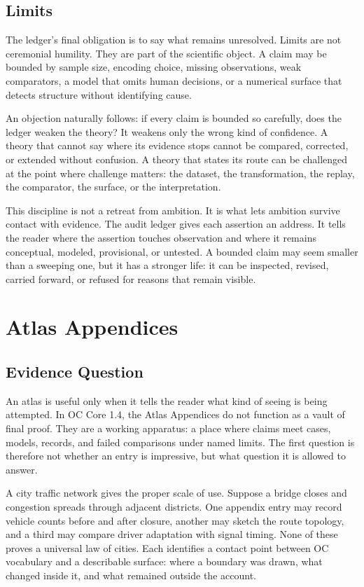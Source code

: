 \documentclass[11pt,a4paper,openany]{book}
\begin{document}
\subsection{Limits}
The ledger's final obligation is to say what remains unresolved. Limits are not ceremonial humility. They are part of the scientific object. A claim may be bounded by sample size, encoding choice, missing observations, weak comparators, a model that omits human decisions, or a numerical surface that detects structure without identifying cause. \cite{newman_networks,barabasi_scale_free}\par
An objection naturally follows: if every claim is bounded so carefully, does the ledger weaken the theory? It weakens only the wrong kind of confidence. A theory that cannot say where its evidence stops cannot be compared, corrected, or extended without confusion. A theory that states its route can be challenged at the point where challenge matters: the dataset, the transformation, the replay, the comparator, the surface, or the interpretation.\par
This discipline is not a retreat from ambition. It is what lets ambition survive contact with evidence. The audit ledger gives each assertion an address. It tells the reader where the assertion touches observation and where it remains conceptual, modeled, provisional, or untested. A bounded claim may seem smaller than a sweeping one, but it has a stronger life: it can be inspected, revised, carried forward, or refused for reasons that remain visible.\par
\section{Atlas Appendices}
\subsection{Evidence Question}
An atlas is useful only when it tells the reader what kind of seeing is being attempted. In OC Core 1.4, the Atlas Appendices do not function as a vault of final proof. They are a working apparatus: a place where claims meet cases, models, records, and failed comparisons under named limits. The first question is therefore not whether an entry is impressive, but what question it is allowed to answer. \cite{barabasi_scale_free,may_stability_complexity}\par
A city traffic network gives the proper scale of use. Suppose a bridge closes and congestion spreads through adjacent districts. One appendix entry may record vehicle counts before and after closure, another may sketch the route topology, and a third may compare driver adaptation with signal timing. None of these proves a universal law of cities. Each identifies a contact point between OC vocabulary and a describable surface: where a boundary was drawn, what changed inside it, and what remained outside the account.\par
\end{document}

